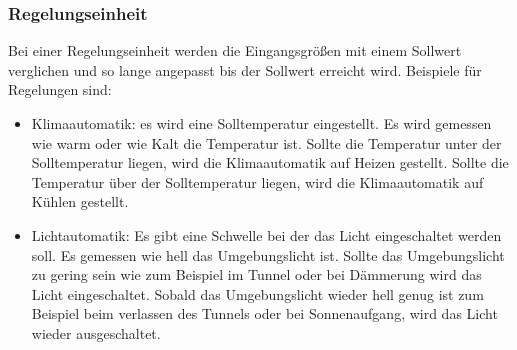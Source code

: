 \subsubsection{Regelungseinheit}
Bei einer Regelungseinheit werden die Eingangsgrößen mit einem Sollwert verglichen und so lange angepasst bis der Sollwert erreicht wird.
Beispiele für Regelungen sind:
\begin{itemize}
	\item Klimaautomatik: es wird eine Solltemperatur eingestellt.
	      Es wird gemessen wie warm oder wie Kalt die Temperatur ist.
	      Sollte die Temperatur unter der Solltemperatur liegen, wird die Klimaautomatik auf Heizen gestellt.
	      Sollte die Temperatur über der Solltemperatur liegen, wird die Klimaautomatik auf Kühlen gestellt.
	\item Lichtautomatik: Es gibt eine Schwelle bei der das Licht eingeschaltet werden soll.
	      Es gemessen wie hell das Umgebungslicht ist.
	      Sollte das Umgebungslicht zu gering sein wie zum Beispiel im Tunnel oder bei Dämmerung wird das Licht eingeschaltet.
	      Sobald das Umgebungslicht wieder hell genug ist zum Beispiel beim verlassen des Tunnels oder bei Sonnenaufgang, wird das Licht wieder ausgeschaltet.
\end{itemize}
